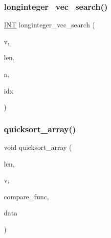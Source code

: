 \mbox{\label{sorting_8_c_a8f968f381a53d806d21ea66a97ab91c8}} 
\subsubsection{\texorpdfstring{longinteger\+\_\+vec\+\_\+search()}{longinteger\_vec\_search()}}
{\footnotesize\ttfamily \mbox{\hyperlink{galois_8h_a09fddde158a3a20bd2dcadb609de11dc}{I\+NT}} longinteger\+\_\+vec\+\_\+search (\begin{DoxyParamCaption}\item[{\mbox{\hyperlink{classlonginteger__object}{longinteger\+\_\+object}} $\ast$}]{v,  }\item[{\mbox{\hyperlink{galois_8h_a09fddde158a3a20bd2dcadb609de11dc}{I\+NT}}}]{len,  }\item[{\mbox{\hyperlink{classlonginteger__object}{longinteger\+\_\+object}} \&}]{a,  }\item[{\mbox{\hyperlink{galois_8h_a09fddde158a3a20bd2dcadb609de11dc}{I\+NT}} \&}]{idx }\end{DoxyParamCaption})}

\mbox{\label{sorting_8_c_a660db9b0f6bc8a01353f32f3e02638f6}} 
\subsubsection{\texorpdfstring{quicksort\+\_\+array()}{quicksort\_array()}}
{\footnotesize\ttfamily void quicksort\+\_\+array (\begin{DoxyParamCaption}\item[{\mbox{\hyperlink{galois_8h_a09fddde158a3a20bd2dcadb609de11dc}{I\+NT}}}]{len,  }\item[{void $\ast$$\ast$}]{v,  }\item[{\mbox{\hyperlink{galois_8h_a09fddde158a3a20bd2dcadb609de11dc}{I\+NT}}($\ast$)(void $\ast$a, void $\ast$\mbox{\hyperlink{alphabet2_8_c_a148e3876077787926724625411d6e7a9}{b}}, void $\ast$data)}]{compare\+\_\+func,  }\item[{void $\ast$}]{data }\end{DoxyParamCaption})}

